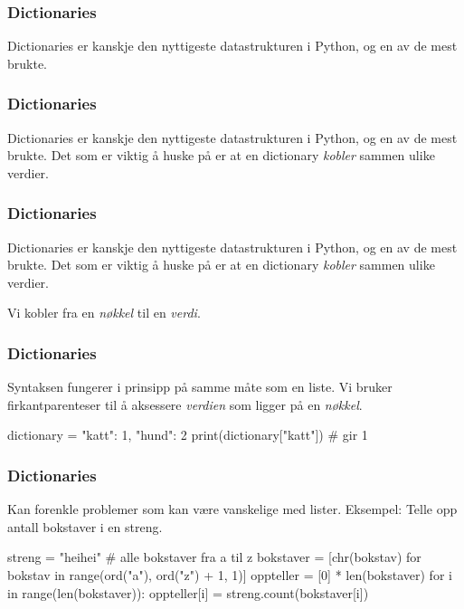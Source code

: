 
\begin{frame}
    \frametitle{Dictionaries}

    Dictionaries er kanskje den nyttigeste datastrukturen i Python, og en av de mest brukte. 

\end{frame}

\begin{frame}
    \frametitle{Dictionaries}

    Dictionaries er kanskje den nyttigeste datastrukturen i Python, og en av de mest brukte. Det som er viktig å huske på er at en dictionary \textit{kobler} sammen ulike verdier. 

\end{frame}

\begin{frame}
    \frametitle{Dictionaries}

    Dictionaries er kanskje den nyttigeste datastrukturen i Python, og en av de mest brukte. Det som er viktig å huske på er at en dictionary \textit{kobler} sammen ulike verdier. 

    Vi kobler fra en \textit{nøkkel} til en \textit{verdi}.

\end{frame}

\begin{frame}[fragile]
    \frametitle{Dictionaries}

    Syntaksen fungerer i prinsipp på samme måte som en liste. Vi bruker firkantparenteser til å aksessere \textit{verdien} som ligger på en \textit{nøkkel}.

\begin{python}
dictionary = {"katt": 1, "hund": 2}
print(dictionary["katt"]) # gir 1
\end{python}

\end{frame}

\begin{frame}[fragile]
    \frametitle{Dictionaries}

    Kan forenkle problemer som kan være vanskelige med lister. Eksempel: Telle opp antall bokstaver i en streng. 

\begin{python}
streng = "heihei"
# alle bokstaver fra a til z
bokstaver = [chr(bokstav) for bokstav in range(ord("a"), ord("z") + 1, 1)]
oppteller = [0] * len(bokstaver)
for i in range(len(bokstaver)): 
    oppteller[i] = streng.count(bokstaver[i])
\end{python}

\end{frame}

